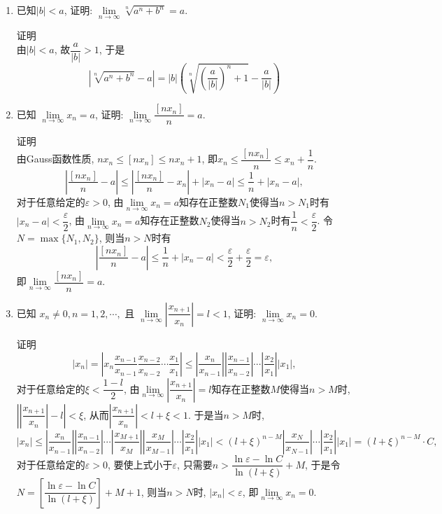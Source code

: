 \documentclass[UTF8,a4paper,20pt]{article}
\begin{document}
\begin{enumerate}
\item {\large\kaishu 已知$|b|<a$, 证明: $\lim\limits_{n \to \infty} \sqrt[n]{a^n+b^n}=a.$}

{\heiti 证明}\\
由$|b|<a$, 故$\dfrac{a}{|b|}>1$, 于是
\[
|\sqrt[n]{a^n+b^n}-a|=|b|\left(\sqrt[n]{\left(\dfrac{a}{|b|}\right)^n+1}-\dfrac{a}{|b|}\right)
\]

\item {\large\kaishu 已知 $\lim\limits_{n \to \infty} x_n=a$, 证明: $\lim\limits_{n \to \infty} \dfrac{[nx_n]}{n}=a.$}

{\heiti 证明}\\
由Gauss函数性质, $nx_n\leqslant[nx_n]\leqslant nx_n+1$, 即$x_n\leqslant\dfrac{[nx_n]}{n}\leqslant x_n+\dfrac{1}{n}$. 
\[
\left|\dfrac{[nx_n]}{n}-a\right|\leqslant \left|\dfrac{[nx_n]}{n}-x_n\right|+|x_n-a|\leqslant \dfrac{1}{n}+|x_n-a|,
\]
对于任意给定的$\varepsilon>0$, 由$\lim\limits_{n \to \infty} x_n=a$知存在正整数$N_1$使得当$n>N_1$时有$|x_n-a|<\dfrac{\varepsilon}{2}$, 由$\lim\limits_{n \to \infty} x_n=a$知存在正整数$N_2$使得当$n>N_2$时有$\dfrac{1}{n}<\dfrac{\varepsilon}{2}$. 令$N=\max\{N_1, N_2\}$, 则当$n>N$时有
\[
\left|\dfrac{[nx_n]}{n}-a\right|\leqslant \dfrac{1}{n}+|x_n-a|<\dfrac{\varepsilon}{2}+\dfrac{\varepsilon}{2}=\varepsilon, 
\]
即$\lim\limits_{n \to \infty} \dfrac{[nx_n]}{n}=a.$

\item {\large\kaishu 已知 $x_n \neq 0, n=1,2,\cdots,$ 且 $\lim\limits_{n \to \infty} \left| \dfrac{x_{n+1}}{x_n} \right| =l<1$, 证明: $\lim\limits_{n \to \infty}x_n=0.$}

{\heiti 证明}\\
\[
|x_n|=\left|x_n \dfrac{x_{n-1}}{x_{n-1}} \dfrac{x_{n-2}}{x_{n-2}} \cdots \dfrac{x_1}{x_1}\right|\leqslant\left|\dfrac{x_n}{x_{n-1}}\right| \left|\dfrac{x_{n-1}}{x_{n-2}}\right| \cdots \left|\dfrac{x_2}{x_1}\right| |x_1|,
\]
对于任意给定的$\xi<\dfrac{1-l}{2}$, 由$\lim\limits_{n \to \infty} \left| \dfrac{x_{n+1}}{x_n} \right| =l$知存在正整数$M$使得当$n>M$时, $\left|\left|\dfrac{x_{n+1}}{x_n}\right|-l\right|<\xi$, 从而$\left|\dfrac{x_{n+1}}{x_n}\right|<l+\xi<1$. 于是当$n>M$时, 
\[
|x_n|\leqslant\left|\dfrac{x_n}{x_{n-1}}\right| \left|\dfrac{x_{n-1}}{x_{n-2}}\right| \cdots \left|\dfrac{x_{M+1}}{x_M}\right|\left|\dfrac{x_{M}}{x_{M-1}}\right|\cdots\left|\dfrac{x_2}{x_1}\right| |x_1|<(l+\xi)^{n-M}\left|\dfrac{x_{N}}{x_{N-1}}\right|\cdots\left|\dfrac{x_2}{x_1}\right| |x_1|=(l+\xi)^{n-M}\cdot C,
\]
对于任意给定的$\varepsilon>0$, 要使上式小于$\varepsilon$, 只需要$n>\dfrac{\ln\varepsilon-\ln C}{\ln(l+\xi)}+M$, 于是令$N=\left[\dfrac{\ln\varepsilon-\ln C}{\ln(l+\xi)}\right]+M+1$, 则当$n>N$时, $|x_n|<\varepsilon$, 即$\lim\limits_{n \to \infty}x_n=0.$


\end{enumerate}
\end{document}
